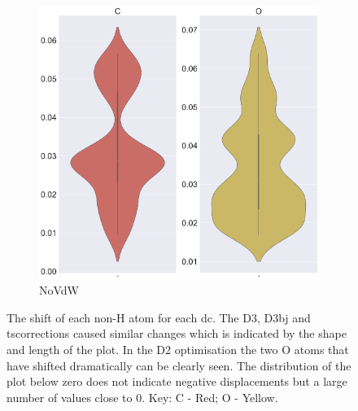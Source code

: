 \begin{figure}
\begin{subfigure}{0.45\textwidth}
\centering
\includegraphics[width=\textwidth]{Figures/Analysis/IVDW/NoVdW_AtomicShift_2.png}
\caption{NoVdW}
\label{fig:StructAnal2_NOVDW}
\end{subfigure}
\captionsetup{font = footnotesize, justification = centering}
\caption[The shift in ångströms of each non-H Atom for each Dispersion Correction]{The shift of each non-H atom for each \acrshort{dc}. The D3, D3\acrshort{bj} and \acrshort{ts}corrections caused similar changes which is indicated by the shape and length of the plot. In the D2 optimisation the two O atoms that have shifted dramatically can be clearly seen. The distribution of the plot below zero does not indicate negative displacements but a large number of values close to 0. Key: C - Red; O - Yellow.}
\label{Fig:StructAnal}
\end{figure}

